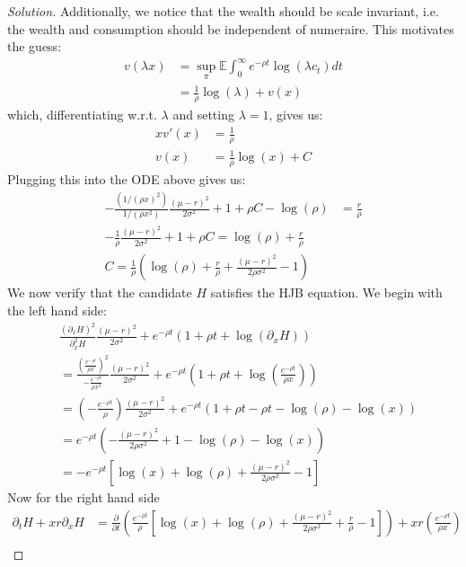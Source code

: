 \documentclass{amsart}
\begin{document}
\begin{proof}[Solution]
    Additionally, we notice that the wealth should be scale invariant, 
    i.e. the wealth and consumption should be independent of numeraire. 
    This motivates the guess: 
    \begin{align*}
        v(\lambda x) &= \sup_\pi \mathbb{E}\int_0^\infty e^{-\rho t}\log(\lambda c_t) dt \\
        &= \frac{1}{\rho}\log(\lambda) + v(x)
    \end{align*}
    which, differentiating w.r.t. $\lambda$ and setting $\lambda = 1$, gives us: 
    \begin{align*}
        x v'(x) &= \frac1{\rho}\\
        v(x) &= \frac{1}{\rho}\log(x) + C
    \end{align*}
    Plugging this into the ODE above gives us: 
    \begin{align*}
        -\frac{(1/(\rho x)^2)}{1/(\rho x^2)} \frac{(\mu - r)^2}{2 \sigma^2} + 1 + \rho C - \log(\rho) &= \frac{r}{\rho}\\
        -\frac{1}{\rho}\frac{(\mu - r)^2}{2 \sigma^2} + 1 + \rho C = \log(\rho) + \frac{r}{\rho}\\
        C = \frac{1}{\rho} \left(\log(\rho) + \frac{r}{\rho} + \frac{(\mu - r)^2}{2 \rho\sigma^2} - 1\right)
    \end{align*}
    We now verify that the candidate $H$ satisfies the HJB equation. We begin with the left hand side:
    \begin{align*}
    &\frac{(\partial_x H)^2}{\partial^2_x H} \frac{(\mu - r)^2}{2\sigma^2} + e^{-\rho t}(1 + \rho t + \log(\partial_x H)) \\
    &= \frac{\left(\frac{e^{-\rho t}}{\rho x}\right)^2}{-\frac{e^{-\rho t}}{\rho x^2}} \frac{(\mu - r)^2}{2\sigma^2} + e^{-\rho t}\left(1 + \rho t + \log\left(\frac{e^{-\rho t}}{\rho x}\right)\right) \\
    &= \left(-\frac{e^{-\rho t}}{\rho}\right) \frac{(\mu - r)^2}{2\sigma^2} + e^{-\rho t}(1 + \rho t - \rho t - \log(\rho) - \log(x)) \\
    &= e^{-\rho t} \left( -\frac{(\mu - r)^2}{2\rho\sigma^2} + 1 - \log(\rho) - \log(x) \right) \\
    &= -e^{-\rho t} \left[ \log(x) + \log(\rho) + \frac{(\mu - r)^2}{2\rho\sigma^2} - 1 \right] 
    \end{align*}
    Now for the right hand side
    \begin{align*}
    \partial_t H + x r \partial_x H 
    &= \frac{\partial}{\partial t} \left( \frac{e^{-\rho t}}{\rho} \left[ \log(x) + \log(\rho) + \frac{(\mu - r)^2}{2\rho\sigma^2} + \frac{r}{\rho} - 1 \right] \right) + x r \left( \frac{e^{-\rho t}}{\rho x} \right) \\

\end{align*}
\end{proof}
\end{document}
